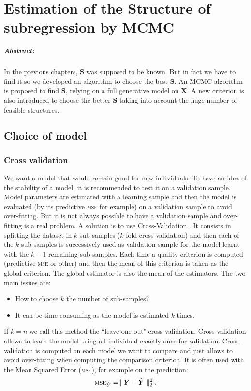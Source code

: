 \documentclass[12pt,a4paper]{report}
\begin{document}
\chapter{Estimation of the Structure of subregression by MCMC}\label{chapterMCMC}
\paragraph{Abstract:} In the previous chapters, $\boldsymbol{S}$ was supposed to be known. But in fact we have to find it so we developed an algorithm to choose the best $\boldsymbol{S}$. An MCMC algorithm is proposed to find $\boldsymbol{S}$, relying on a full generative model on $\boldsymbol{X}$. A new criterion is also introduced to choose the better $\boldsymbol{S}$ taking into account the huge number of feasible structures.
\section{Choice of model}
			\subsection{Cross validation}
				
				We want a model that would remain good for new individuals. To have an idea of the stability of a model, it is recommended to test it on a validation sample. Model parameters are estimated with a learning sample and then the model is evaluated (by its predictive \textsc{mse} for example) on a validation sample to avoid over-fitting. But it is not always possible to have a validation sample and over-fitting is a real problem. A solution is to use Cross-Validation \cite{kohavi1995study,arlot2010survey}. It consists in splitting the dataset in $k$ sub-samples ($k$-fold cross-validation) and then each of the $k$ sub-samples is successively used as validation sample for the model learnt with the $k-1$ remaining sub-samples. Each time a quality criterion  is computed (predictive \textsc{mse} or other) and then the mean of this criterion is taken as the global criterion. The global estimator is also the mean of the estimators. The two main issues are:
				\begin{itemize}
					\item How to choose $k$ the number of sub-samples?
					\item It can be time consuming as the model is estimated $k$ times.
				\end{itemize}
				If $k=n$ we call this method the ``leave-one-out" cross-validation.
				Cross-validation allows to learn the model using all individual exactly once for validation.
				Cross-validation is computed on each model we want to compare and just allows to avoid over-fitting when computing the comparison criterion.
				It is often used with the Mean Squared Error (\textsc{mse}), for example on the prediction:
				\begin{equation}
					\textsc{mse}_{\hat{Y}}=\parallel \boldsymbol{Y}-\hat{\boldsymbol{Y}} \parallel^2_2 . \nonumber
				\end{equation}
\end{document}
